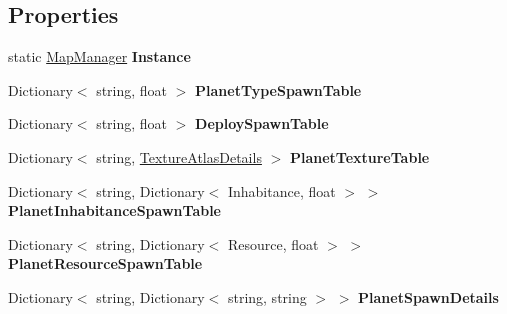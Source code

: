 \subsection*{Properties}
\begin{DoxyCompactItemize}
\item 
\hypertarget{class_map_manager_a8b7161b17052288f0f1d8e822629d5ed}{}static \hyperlink{class_map_manager}{Map\+Manager} {\bfseries Instance}\label{class_map_manager_a8b7161b17052288f0f1d8e822629d5ed}

\item 
\hypertarget{class_map_manager_a2d1e787c44c8bfd6697def55e6472f7f}{}Dictionary$<$ string, float $>$ {\bfseries Planet\+Type\+Spawn\+Table}\label{class_map_manager_a2d1e787c44c8bfd6697def55e6472f7f}

\item 
\hypertarget{class_map_manager_a661720b3368f2e08d422ef52b0b4c8fa}{}Dictionary$<$ string, float $>$ {\bfseries Deploy\+Spawn\+Table}\label{class_map_manager_a661720b3368f2e08d422ef52b0b4c8fa}

\item 
\hypertarget{class_map_manager_a6a017da4d7f9e3f2446f0421a0d3e47f}{}Dictionary$<$ string, \hyperlink{struct_texture_atlas_details}{Texture\+Atlas\+Details} $>$ {\bfseries Planet\+Texture\+Table}\label{class_map_manager_a6a017da4d7f9e3f2446f0421a0d3e47f}

\item 
\hypertarget{class_map_manager_ae8dd00a2301b16154d920fe5ef028cb9}{}Dictionary$<$ string, Dictionary$<$ Inhabitance, float $>$ $>$ {\bfseries Planet\+Inhabitance\+Spawn\+Table}\label{class_map_manager_ae8dd00a2301b16154d920fe5ef028cb9}

\item 
\hypertarget{class_map_manager_a7991bb12fb212b9b5afda735b2fb8d19}{}Dictionary$<$ string, Dictionary$<$ Resource, float $>$ $>$ {\bfseries Planet\+Resource\+Spawn\+Table}\label{class_map_manager_a7991bb12fb212b9b5afda735b2fb8d19}

\item 
\hypertarget{class_map_manager_a29725869358b848553ad634f9ed1b98d}{}Dictionary$<$ string, Dictionary$<$ string, string $>$ $>$ {\bfseries Planet\+Spawn\+Details}\label{class_map_manager_a29725869358b848553ad634f9ed1b98d}


\end{DoxyCompactItemize}
